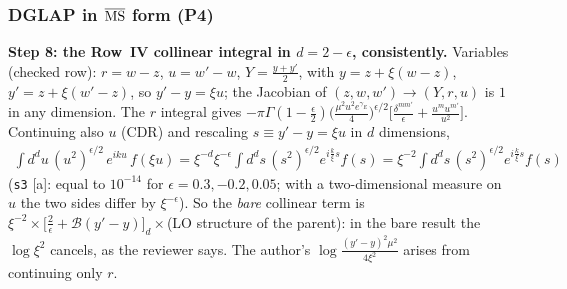 \documentclass[10pt]{article}
\begin{document}
\subsubsection{DGLAP in $\overline{\rm MS}$ form (P4)}

\noindent\textbf{Step 8: the Row~IV collinear integral in $d=2-\epsilon$, consistently.} Variables (checked row): $r=w-z$, $u=w'-w$, $Y=\frac{y+y'}{2}$, with $y=z+\xi(w-z)$, $y'=z+\xi(w'-z)$, so $y'-y=\xi u$; the Jacobian of $(z,w,w')\to(Y,r,u)$ is $1$ in any dimension. The $r$ integral gives $-\pi\Gamma(1-\frac{\epsilon}{2})\big(\frac{\mu^{2}u^{2}e^{\gamma_{E}}}{4}\big)^{\epsilon/2}\big[\frac{\delta^{mm'}}{\epsilon}+\frac{u^{m}u^{m'}}{u^{2}}\big]$. Continuing also $u$ (CDR) and rescaling $s\equiv y'-y=\xi u$ in $d$ dimensions,
\begin{align}
\int d^{d}u\,(u^{2})^{\epsilon/2}\,e^{iku}\,f(\xi u)=\xi^{-d}\xi^{-\epsilon}\int d^{d}s\,(s^{2})^{\epsilon/2}e^{i\frac{k}{\xi}s}f(s)=\xi^{-2}\int d^{d}s\,(s^{2})^{\epsilon/2}e^{i\frac{k}{\xi}s}f(s)
\label{eq:pd-resc}
\end{align}
(\texttt{s3} [a]: equal to $10^{-14}$ for $\epsilon=0.3,-0.2,0.05$; with a two-dimensional measure on $u$ the two sides differ by $\xi^{-\epsilon}$). So the \emph{bare} collinear term is $\xi^{-2}\times\big[\frac{2}{\epsilon}+\mathcal{B}(y'-y)\big]_{d}\times$(LO structure of the parent): in the bare result the $\log\xi^{2}$ cancels, as the reviewer says. The author's $\log\frac{(y'-y)^{2}\mu^{2}}{4\xi^{2}}$ arises from continuing only $r$.
\end{document}
